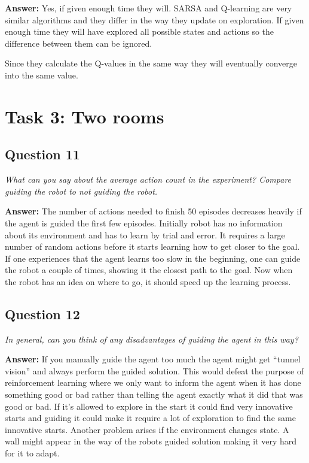\documentclass[a4paper]{article}
\begin{document}
\textbf{Answer:} Yes, if given enough time they will. SARSA and Q-learning are very similar algorithms and they differ in the way they update on exploration. If given enough time they will have explored all possible states and actions so the difference between them can be ignored. 

Since they calculate the Q-values in the same way they will eventually converge into the same value.

\section{Task 3: Two rooms}

\subsection*{Question 11}
\emph{What can you say about the average action count in the experiment? Compare guiding the robot to not guiding the robot.}

\textbf{Answer:} 
The number of actions needed to finish 50 episodes decreases heavily if the agent is guided the first few episodes. Initially robot has no information about its environment and has to learn by trial and error. It requires a large number of random actions before it starts learning how to get closer to the goal. If one experiences that the agent learns too slow in the beginning, one can guide the robot a couple of times, showing it the closest path to the goal. Now when the robot has an idea on where to go, it should speed up the learning process. 

\subsection*{Question 12}
\emph{In general, can you think of any disadvantages of guiding the
agent in this way?} 

\textbf{Answer:} If you manually guide the agent too much the agent might get ``tunnel vision'' and always perform the guided solution. This would defeat the purpose of reinforcement learning where we only want to inform the agent when it has done something good or bad rather than telling the agent exactly what it did that was good or bad. If it's allowed to explore in the start it could find very innovative starts and guiding it could make it require a lot of exploration to find the same innovative starts. Another problem arises if the environment changes state. A wall might appear in the way of the robots guided solution making it very hard for it to adapt. 
\end{document}
